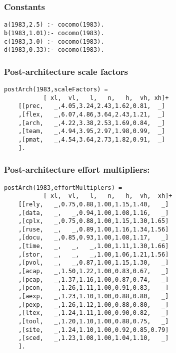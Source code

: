 \subsubsection{ Constants }\begin{Verbatim}
a(1983,2.5) :- cocomo(1983).
b(1983,1.01):- cocomo(1983).
c(1983,3.0) :- cocomo(1983).
d(1983,0.33):- cocomo(1983).
\end{Verbatim}
\subsubsection{ Post-architecture scale factors }\begin{Verbatim}
postArch(1983,scaleFactors) =
           [ xl,  vl,   l,   n,   h,  vh, xh]+
    [[prec,   _,4.05,3.24,2.43,1.62,0.81,  _]
    ,[flex,   _,6.07,4.86,3.64,2.43,1.21,  _]
    ,[arch,   _,4.22,3.38,2.53,1.69,0.84,  _]
    ,[team,   _,4.94,3.95,2.97,1.98,0.99,  _]
    ,[pmat,   _,4.54,3.64,2.73,1.82,0.91,  _]
    ].
\end{Verbatim}
\subsubsection{ Post-architecture effort multipliers:  }\begin{Verbatim}
postArch(1983,effortMultiplers) =
           [ xl,  vl,   l,   n,   h,  vh,  xh]+
    [[rely,   _,0.75,0.88,1.00,1.15,1.40,   _]
    ,[data,   _,   _,0.94,1.00,1.08,1.16,   _]
    ,[cplx,   _,0.75,0.88,1.00,1.15,1.30,1.65]
    ,[ruse,   _,   _,0.89,1.00,1.16,1.34,1.56]
    ,[docu,   _,0.85,0.93,1.00,1.08,1.17,   _]
    ,[time,   _,   _,   _,1.00,1.11,1.30,1.66]
    ,[stor,   _,   _,   _,1.00,1.06,1.21,1.56]
    ,[pvol,   _,   _,0.87,1.00,1.15,1.30,   _]
    ,[acap,   _,1.50,1.22,1.00,0.83,0.67,   _]
    ,[pcap,   _,1.37,1.16,1.00,0.87,0.74,   _]
    ,[pcon,   _,1.26,1.11,1.00,0.91,0.83,   _]
    ,[aexp,   _,1.23,1.10,1.00,0.88,0.80,   _]
    ,[pexp,   _,1.26,1.12,1.00,0.88,0.80,   _]
    ,[ltex,   _,1.24,1.11,1.00,0.90,0.82,   _]
    ,[tool,   _,1.20,1.10,1.00,0.88,0.75,   _]
    ,[site,   _,1.24,1.10,1.00,0.92,0.85,0.79]
    ,[sced,   _,1.23,1.08,1.00,1.04,1.10,   _]
    ].
\end{Verbatim}
